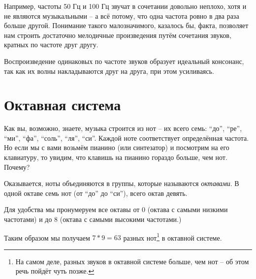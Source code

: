 \documentclass[a4paper,twoside]{book}
\begin{document}
Например, частоты 50 Гц и 100 Гц звучат в сочетании довольно неплохо, хотя и не
являются музыкальными -- а всё потому, что одна частота ровно в два раза больше
другой. Понимание такого малозначимого, казалось бы, факта, позволяет нам
строить достаточно мелодичные произведения путём сочетания звуков, кратных по
частоте друг другу.

Воспроизведение одинаковых по частоте звуков образует идеальный консонанс, так
как их волны накладываются друг на друга, при этом усиливаясь.



\section{Октавная система}

Как вы, возможно, знаете, музыка строится из нот -- их всего семь: ``до'',
``ре'', ``ми'', ``фа'', ``соль'', ``ля'', ``си''. Каждой ноте соответствует
определённая частота. Но если мы с вами возьмём пианино (или синтезатор) и
посмотрим на его клавиатуру, то увидим, что клавишь на пианино гораздо больше,
чем нот.  Почему?

Оказывается, ноты объединяются в группы, которые называются \emph{октавами}. В
одной октаве семь нот (от ``до'' до ``си''), всего октав девять.

Для удобства мы пронумеруем все октавы от 0 (октава с самыми низкими частотами)
и до 8 (октава с самыми высокими частотами.)

Таким образом мы получаем $7 * 9 = 63$ разных нот\footnote{На самом деле, разных
звуков в октавной системе больше, чем нот -- об этом речь пойдёт чуть позже.} в
октавной системе.
\end{document}
